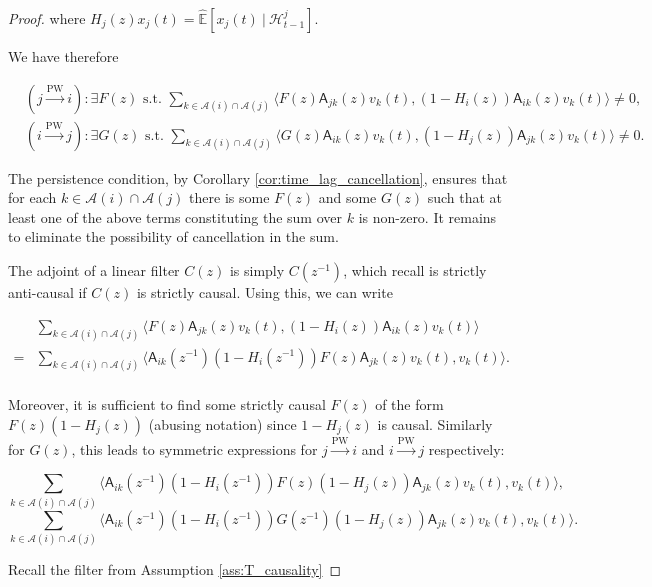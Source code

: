 \documentclass{statsoc}
\def\pwgc{\overset{\text{PW}}{\rightarrow}}  %
\def\A{\mathsf{A}}  %
\def\H{\mathcal{H}}  %
\newcommand{\linE}[2]{\hat{\E}[#1\ |\ #2]}  %
\newcommand{\anc}[1]{\mathcal{A}(#1)}  %
\def\H{\mathcal{H}}  %
\def\E{\mathbb{E}}  %
\newcommand{\inner}[2]{\langle #1, #2 \rangle}  %
\begin{document}
\begin{proof}
  where $H_j(z)x_j(t) = \linE{x_j(t)}{\H_{t - 1}^j}.$

  We have therefore

  \begin{align}
      &(j \pwgc i): \exists F(z) \text{ s.t. } \sum_{k \in \anc{i} \cap \anc{j}}\inner{F(z)\A_{jk}(z)v_k(t)}{(1 - H_i(z))\A_{ik}(z)v_k(t)} \ne 0,\\
      &(i \pwgc j): \exists G(z) \text{ s.t. } \sum_{k \in \anc{i} \cap \anc{j}}\inner{G(z)\A_{ik}(z)v_k(t)}{(1 - H_j(z))\A_{jk}(z)v_k(t)} \ne 0.
  \end{align}

  The persistence condition, by Corollary
  \ref{cor:time_lag_cancellation}, ensures that for each
  $k \in \anc{i}\cap\anc{j}$ there is some $F(z)$ and some $G(z)$ such
  that at least one of the above terms constituting the sum over $k$
  is non-zero.  It remains to eliminate the possibility of
  cancellation in the sum.

  The adjoint of a linear filter $C(z)$ is simply $C(z^{-1})$, which
  recall is strictly anti-causal if $C(z)$ is strictly causal.  Using
  this, we can write

  \begin{align*}
    &\sum_{k \in \anc{i} \cap \anc{j}}\inner{F(z)\A_{jk}(z)v_k(t)}{(1 - H_i(z))\A_{ik}(z)v_k(t)}\\
    = &\sum_{k \in \anc{i} \cap \anc{j}}\inner{\A_{ik}(z^{-1})(1 - H_i(z^{-1}))F(z)\A_{jk}(z)v_k(t)}{v_k(t)}.\\
  \end{align*}

  Moreover, it is sufficient to find some strictly causal $F(z)$ of
  the form $F(z)(1 - H_j(z))$ (abusing notation) since $1 - H_j(z)$ is
  causal.  Similarly for $G(z)$, this leads to symmetric expressions
  for $j \pwgc i$ and $i \pwgc j$ respectively:

  \begin{equation}
    \label{eqn:T_F}
    \sum_{k \in \anc{i} \cap \anc{j}}\inner{\A_{ik}(z^{-1})(1 - H_i(z^{-1}))F(z)(1 - H_j(z))\A_{jk}(z)v_k(t)}{v_k(t)},
  \end{equation}
  \begin{equation}
    \label{eqn:T_G}
    \sum_{k \in \anc{i} \cap \anc{j}}\inner{\A_{ik}(z^{-1})(1 - H_i(z^{-1}))G(z^{-1})(1 - H_j(z))\A_{jk}(z)v_k(t)}{v_k(t)}.
  \end{equation}

  Recall the filter from Assumption \ref{ass:T_causality}


\end{proof}
\end{document}
